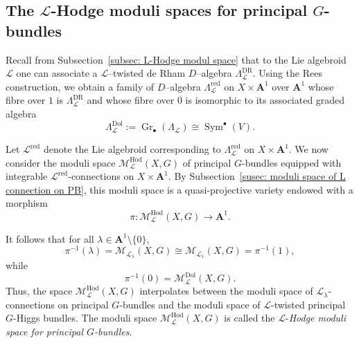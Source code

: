 \documentclass[12pt,reqno]{amsart}
\numberwithin{equation}{subsection}
\newtheorem{thm}[equation]{Theorem}
\theoremstyle{definition}
\theoremstyle{theorem}
\begin{document}
	


\subsection{The $\mathcal{L}$-Hodge moduli spaces for principal $G$-bundles}
\label{The-L-Hodge-moduli-spaces-for-principal-bundles}

Recall from Subsection~\eqref{subsec: L-Hodge modul space} that to the Lie algebroid $\mathcal{L}$ one can associate a $\mathcal{L}$--twisted de Rham $D$--algebra $\Lambda^{\text{DR}}_{\mathcal{L}}$. Using the Rees construction, we obtain a family of $D$--algebra 
$\Lambda_{\mathcal{L}}^{\mathrm{red}}$ on $X \times \mathbf{A}^{1}$ over
$\mathbf{A}^{1}$ whose fibre over $1$ is $\Lambda^{\text{DR}}_{\mathcal{L}}$ and whose fibre
over $0$ is isomorphic to its associated graded algebra
\[
\Lambda_{\mathcal{L}}^{\mathrm{Dol}}
:= \operatorname{Gr}_{\bullet}(\Lambda_{\mathcal{L}})
\cong \operatorname{Sym}^{\bullet}(V).
\]


Let $\mathcal{L}^{\mathrm{red}}$ denote the Lie algebroid corresponding to
$\Lambda^{\mathrm{red}}_{\mathcal{L}}$ on $X \times \mathbf{A}^{1}$.
We now consider the moduli space
$\mathcal{M}_{\mathcal{L}}^{\mathrm{Hod}}(X,G)$ of principal $G$-bundles equipped
with integrable $\mathcal{L}^{\mathrm{red}}$-connections on
$X \times \mathbf{A}^{1}$.
By Subsection~\eqref{susec: moduli space of L connection on PB}, this moduli space
is a quasi-projective variety endowed with a morphism
\[
\pi:\mathcal{M}_{\mathcal{L}}^{\mathrm{Hod}}(X,G) \longrightarrow \mathbf{A}^{1}.
\]

It follows that for all $\lambda \in \mathbf{A}^{1} \setminus \{0\}$,
\[
\pi^{-1}(\lambda)
= \mathcal{M}_{\mathcal{L}_{\lambda}}(X,G)
\cong \mathcal{M}_{\mathcal{L}_{1}}(X,G)
= \pi^{-1}(1),
\]
while
\[
\pi^{-1}(0)=\mathcal{M}_{\mathcal{L}}^{\mathrm{Dol}}(X,G).
\]
Thus, the space $\mathcal{M}_{\mathcal{L}}^{\mathrm{Hod}}(X,G)$ interpolates
between the moduli space of $\mathcal{L}_{\lambda}$-connections on principal
$G$-bundles and the moduli space of $\mathcal{L}$-twisted principal $G$-Higgs
bundles. The moduli space
$\mathcal{M}_{\mathcal{L}}^{\mathrm{Hod}}(X,G)$ is called the
$\mathcal{L}$-\emph{Hodge moduli space for principal $G$-bundles}.
\end{document}
